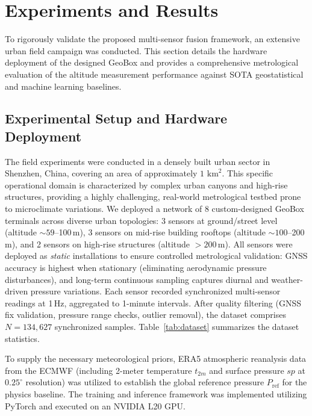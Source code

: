 
\section{Experiments and Results}
\label{sec:experiments}
To rigorously validate the proposed multi-sensor fusion framework, an extensive urban field campaign was conducted. This section details the hardware deployment of the designed GeoBox and provides a comprehensive metrological evaluation of the altitude measurement performance against SOTA geostatistical and machine learning baselines.

\subsection{Experimental Setup and Hardware Deployment}
\label{subsec:exp_setup}

The field experiments were conducted in a densely built urban sector in Shenzhen, China, covering an area of approximately $1 \text{ km}^2$. This specific operational domain is characterized by complex urban canyons and high-rise structures, providing a highly challenging, real-world metrological testbed prone to microclimate variations. We deployed a network of 8 custom-designed GeoBox terminals across diverse urban topologies: 3 sensors at ground/street level (altitude ${\sim}59$--100\,m), 3 sensors on mid-rise building rooftops (altitude ${\sim}100$--200\,m), and 2 sensors on high-rise structures (altitude $>200$\,m). All sensors were deployed as \emph{static} installations to ensure controlled metrological validation: GNSS accuracy is highest when stationary (eliminating aerodynamic pressure disturbances), and long-term continuous sampling captures diurnal and weather-driven pressure variations. Each sensor recorded synchronized multi-sensor readings at 1\,Hz, aggregated to 1-minute intervals. After quality filtering (GNSS fix validation, pressure range checks, outlier removal), the dataset comprises $N = 134{,}627$ synchronized samples. Table~\ref{tab:dataset} summarizes the dataset statistics.

To supply the necessary meteorological priors, ERA5 atmospheric reanalysis data from the ECMWF (including 2-meter temperature $t_{2m}$ and surface pressure $sp$ at $0.25^\circ$ resolution) was utilized to establish the global reference pressure $P_\text{ref}$ for the physics baseline. The training and inference framework was implemented utilizing PyTorch and executed on an NVIDIA L20 GPU.

